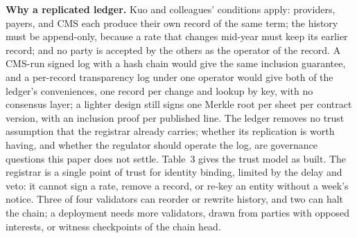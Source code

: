 \documentclass[10pt]{article}
\begin{document}
\textbf{Why a replicated ledger.} Kuo and colleagues' conditions apply: providers, payers, and CMS each produce their own record of the same term; the history must be append-only, because a rate that changes mid-year must keep its earlier record; and no party is accepted by the others as the operator of the record. A CMS-run signed log with a hash chain would give the same inclusion guarantee, and a per-record transparency log under one operator would give both of the ledger's conveniences, one record per change and lookup by key, with no consensus layer; a lighter design still signs one Merkle root per sheet per contract version, with an inclusion proof per published line. The ledger removes no trust assumption that the registrar already carries; whether its replication is worth having, and whether the regulator should operate the log, are governance questions this paper does not settle. Table~3 gives the trust model as built. The registrar is a single point of trust for identity binding, limited by the delay and veto: it cannot sign a rate, remove a record, or re-key an entity without a week's notice. Three of four validators can reorder or rewrite history, and two can halt the chain; a deployment needs more validators, drawn from parties with opposed interests, or witness checkpoints of the chain head.
\end{document}
